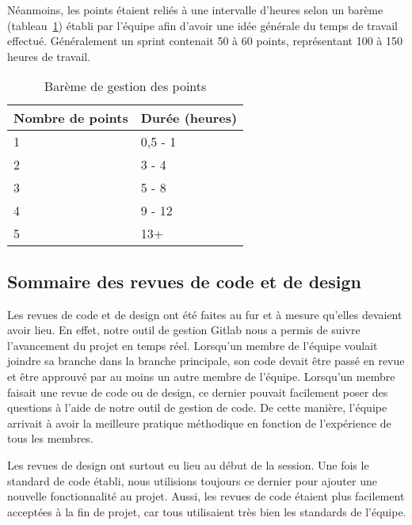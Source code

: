     Néanmoins, les points étaient reliés à une intervalle d'heures selon un barème (tableau~\ref{tab.bareme}) établi par l'équipe afin d'avoir une idée générale du temps de travail effectué. Généralement un sprint contenait 50 à 60 points, représentant 100 à 150 heures de travail.
    
    \begin{table}[bhp]
        \centering
        \caption{Barème de gestion des points}
        \begingroup
        \renewcommand{\arraystretch}{1}
        \begin{tabular}{ll}
            \hline
            \bf Nombre de points & \bf Durée (heures) \\
            \hline
            \hline
            1 & 0,5 - 1 \\
            2 & 3 - 4 \\
            3 & 5 - 8 \\
            4 & 9 - 12 \\
            5 & 13+ \\
            \hline
        \end{tabular}
        \endgroup
        \label{tab.bareme}
    \end{table}

    \subsection{Sommaire des revues de code et de design}
    Les revues de code et de design ont été faites au fur et à mesure qu'elles devaient avoir lieu. En effet, notre outil de gestion Gitlab nous a permis de suivre l'avancement du projet en temps réel. Lorsqu'un membre de l'équipe voulait joindre sa branche dans la branche principale, son code devait être passé en revue et être approuvé par au moins un autre membre de l'équipe. Lorsqu'un membre faisait une revue de code ou de design, ce dernier pouvait facilement poser des questions à l'aide de notre outil de gestion de code. De cette manière, l'équipe arrivait à avoir la meilleure pratique méthodique en fonction de l'expérience de tous les membres.
 
    Les revues de design ont surtout eu lieu au début de la session. Une fois le standard de code établi, nous utilisions toujours ce dernier pour ajouter une nouvelle fonctionnalité au projet. Aussi, les revues de code étaient plus facilement acceptées à la fin de projet, car tous utilisaient très bien les standards de l'équipe.

